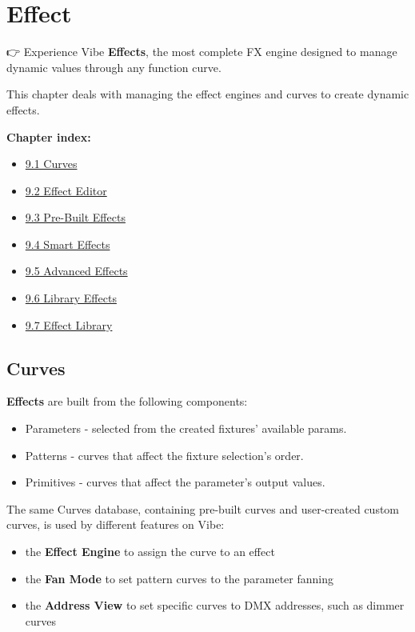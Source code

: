\documentclass[
]{article}
\providecommand{\tightlist}{%
  \setlength{\itemsep}{0pt}\setlength{\parskip}{0pt}}
\begin{document}
\hypertarget{effect}{%
\section{Effect}\label{effect}}

👉 Experience Vibe \textbf{Effects}, the most complete FX engine designed to manage dynamic values through any function curve.

This chapter deals with managing the effect engines and curves to create dynamic effects.

\textbf{Chapter index:}

\begin{itemize}
\tightlist
\item
  \protect\hyperlink{Curves-9.1}{9.1 Curves}
\item
  \protect\hyperlink{Effect-Editor-9.2}{9.2 Effect Editor}
\item
  \protect\hyperlink{Pre-Built-Effects-9.3}{9.3 Pre-Built Effects}
\item
  \protect\hyperlink{Smart-Effects-9.4}{9.4 Smart Effects}
\item
  \protect\hyperlink{Advanced-Effects-9.5}{9.5 Advanced Effects}
\item
  \protect\hyperlink{Library-Effects-9.6}{9.6 Library Effects}
\item
  \protect\hyperlink{Effect-Library-9.7}{9.7 Effect Library}
\end{itemize}

\hypertarget{Curves-9.1}{%
\subsection{Curves}\label{Curves-9.1}}

\textbf{Effects} are built from the following components:

\begin{itemize}
\item
  Parameters - selected from the created fixtures' available params.
\item
  Patterns - curves that affect the fixture selection's order.
\item
  Primitives - curves that affect the parameter's output values.
\end{itemize}

The same Curves database, containing pre-built curves and user-created custom curves, is used by different features on Vibe:

\begin{itemize}
\item
  the \textbf{Effect Engine} to assign the curve to an effect
\item
  the \textbf{Fan Mode} to set pattern curves to the parameter fanning
\item
  the \textbf{Address View} to set specific curves to DMX addresses, such as dimmer curves
\end{itemize}
\end{document}
